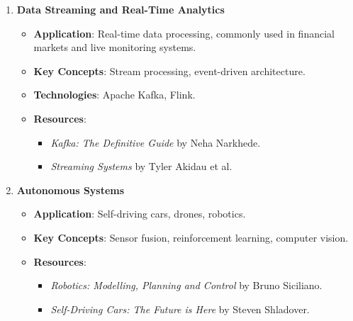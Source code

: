 \documentclass{article}
\begin{document}
\begin{enumerate}
    \item \textbf{Data Streaming and Real-Time Analytics}
    \begin{itemize}
        \item \textbf{Application}: Real-time data processing, commonly used in financial markets and live monitoring systems.
        \item \textbf{Key Concepts}: Stream processing, event-driven architecture.
        \item \textbf{Technologies}: Apache Kafka, Flink.
        \item \textbf{Resources}:
        \begin{itemize}
            \item \textit{Kafka: The Definitive Guide} by Neha Narkhede.
            \item \textit{Streaming Systems} by Tyler Akidau et al.
        \end{itemize}
    \end{itemize}

    \item \textbf{Autonomous Systems}
    \begin{itemize}
        \item \textbf{Application}: Self-driving cars, drones, robotics.
        \item \textbf{Key Concepts}: Sensor fusion, reinforcement learning, computer vision.
        \item \textbf{Resources}:
        \begin{itemize}
            \item \textit{Robotics: Modelling, Planning and Control} by Bruno Siciliano.
            \item \textit{Self-Driving Cars: The Future is Here} by Steven Shladover.
        \end{itemize}
    \end{itemize}
\end{enumerate}
\end{document}
